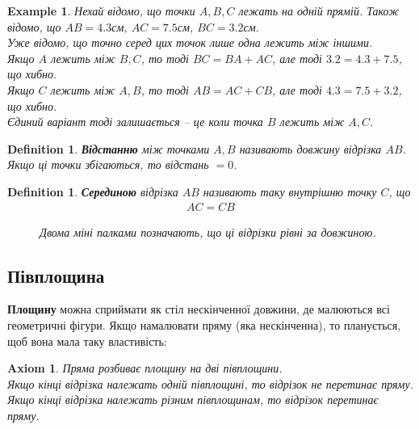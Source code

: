 \documentclass[a4paper, 10pt]{article}
\theoremstyle{theoremdd}
\theoremstyle{theoremdd}
\newtheorem{axiom}{Axiom}
\theoremstyle{theoremdd}
\newtheorem{definition}[theorem]{Definition}
\theoremstyle{theoremdd}
\theoremstyle{theoremdd}
\newtheorem{example}[theorem]{Example}
\theoremstyle{theoremdd}
\theoremstyle{theoremdd}
\theoremstyle{theoremdd}
\theoremstyle{theoremdd}
\begin{document}
\begin{example}
Нехай відомо, що точки $A,B,C$ лежать на одній прямій. Також відомо, що $AB = 4.3$см, $AC=7.5$см, $BC = 3.2$см.\\
Уже відомо, що точно серед цих точок лише одна лежить між іншими.\\
Якщо $A$ лежить між $B,C$, то тоді $BC = BA + AC$, але тоді $3.2 = 4.3 + 7.5$, що хибно.\\
Якщо $C$ лежить між $A,B$, то тоді $AB = AC + CB$, але тоді $4.3 = 7.5 + 3.2$, що хибно.\\
Єдиний варіант тоді залишається -- це коли точка $B$ лежить між $A,C$.
\end{example}

\begin{definition}
\textbf{Відстанню} між точками $A,B$ називають довжину відрізка $AB$.\\
Якщо ці точки збігаються, то відстань $= 0$.
\end{definition}

\begin{definition}
\textbf{Серединою} відрізка $AB$ називають таку внутрішню точку $C$, що
\begin{align*}
AC = CB
\end{align*}
\begin{figure}[H]
\centering
{}
\caption*{Двома міні палками позначають, що ці відрізки рівні за довжиною.}
\end{figure}
\end{definition}

\subsection{Півплощина}
\textbf{Площину} можна сприймати як стіл нескінченної довжини, де малюються всі геометричні фігури. Якщо намалювати пряму (яка нескінченна), то планується, щоб вона мала таку властивість:
\begin{axiom}
Пряма розбиває площину на дві півплощини. \\
Якщо кінці відрізка належать одній півплощині, то відрізок не перетинає пряму. Якщо кінці відрізка належать різним півплощинам, то відрізок перетинає пряму.
\end{axiom}
\end{document}
